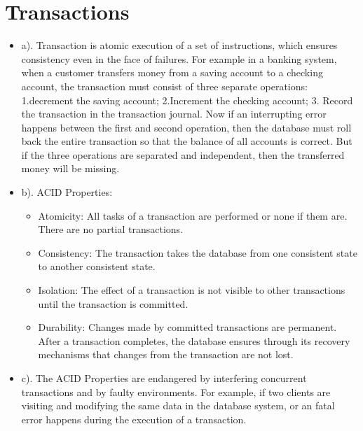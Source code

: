\documentclass[a4paper, 14pt]{article}
\begin{document}
\section{Transactions}
\begin{itemize}
\item a). Transaction is atomic execution of a set of instructions, which ensures consistency even in the face of failures. For example in a banking system, when a customer transfers money from a saving account to a checking account, the transaction must consist of three separate operations: 1.decrement the saving account; 2.Increment the checking account; 3. Record the transaction in the transaction journal. Now if an interrupting error happens between the first and second operation, then the database must roll back the entire transaction so that the balance of all accounts is correct. But if the three operations are separated and independent, then the transferred money will be missing.
\item b). ACID Properties: \\
    \begin{itemize}
    \item Atomicity: All tasks of a transaction are performed or none if them are. There are no partial transactions.
    \item Consistency: The transaction takes the database from one consistent state to another consistent state.
    \item Isolation: The effect of a transaction is not visible to other transactions until the transaction is committed.
    \item Durability: Changes made by committed transactions are permanent. After a transaction completes, the database ensures through its recovery mechanisms that changes from the transaction are not lost.
    \end {itemize}
\item c). The ACID Properties are endangered by interfering concurrent transactions and by faulty environments. For example, if two clients are visiting and modifying the same data in the database system, or an fatal error happens during the execution of a transaction.

\end{itemize}
\end{document}
